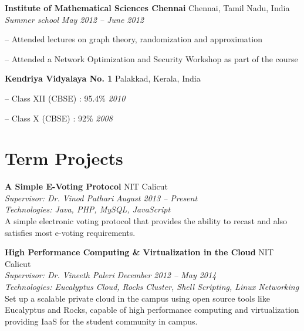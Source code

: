 \documentclass[margin,line]{resume}
\begin{document}
\begin{resume}
    \vspace{2mm}
    
    \textbf{Institute of Mathematical Sciences Chennai} \hfill Chennai, Tamil Nadu, India
    \\
    \textit{Summer school} \hfill \textit{ May 2012 -- June 2012}
    
    \begin{compactitem}
        \item[--] Attended lectures on graph theory, randomization and approximation 
        \item[--] Attended a Network Optimization and Security Workshop as part of the course
    \end{compactitem}
    
    \vspace{2mm}
    
    \textbf{Kendriya Vidyalaya No. 1} \hfill Palakkad, Kerala, India 
    \vspace{+0.5mm}
    \begin{compactitem}
        \item[--] Class XII (CBSE) : 95.4\%    \hfill    \textit{2010}
        \item[--] Class X (CBSE) : 92\%        \hfill    \textit{2008}
    \end{compactitem}
    
     \vspace{2mm}%
     
    \section{\mysidestyle Term Projects}

	
    \textbf{A Simple E-Voting Protocol} 				\hfill NIT Calicut 
    \\
    \textit{Supervisor: Dr. Vinod Pathari } 			\hfill \textit{August 2013 -- Present}
    \\
    \textit{Technologies: Java, PHP, MySQL, JavaScript}
    \\
    A simple electronic voting protocol that provides the ability to recast and also satisfies most e-voting requirements.
    
    \textbf{High Performance Computing \& Virtualization in the Cloud} 				\hfill NIT Calicut
    \\
    \textit{Supervisor: Dr. Vineeth Paleri } 			\hfill \textit{December 2012 -- May 2014}
    \\
    \textit{Technologies: Eucalyptus Cloud, Rocks Cluster, Shell Scripting, Linux Networking}
    \\
    Set up a scalable private cloud in the campus using open source tools like Eucalyptus and Rocks,
capable of high performance computing and virtualization providing IaaS for the student community in campus.
	

\end{resume}
\end{document}
